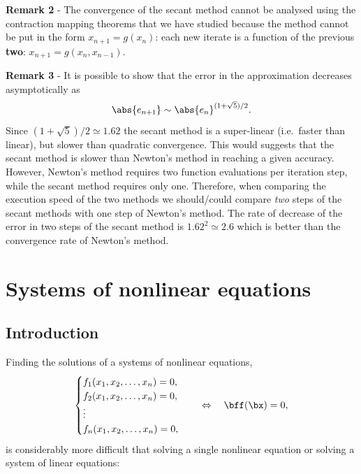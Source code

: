\noindent
\textbf{Remark 2} - The convergence of the secant method cannot be
analysed using the contraction mapping theorems that we have studied
because the method cannot be put in the form $x_{n+1} = g(x_n)$: each
new iterate is a function of the previous \textbf{two}: $x_{n+1} =
g(x_n, x_{n-1})$.

\noindent
\textbf{Remark 3} - It is possible to show that the
error in the approximation decreases asymptotically as
%
\begin{equation*}
  \abs{e_{n+1}} \sim \abs{e_n}^{(1+\sqrt{5})/2} .
\end{equation*}
%
Since $(1+\sqrt{5})/2 \simeq 1.62$ the secant method is a super-linear
(i.e.\ faster than linear), but slower than quadratic convergence.
This would suggests that the secant method is slower than Newton's
method in reaching a given accuracy.  However, Newton's method
requires two function evaluations per iteration step, while the secant
method requires only one.  Therefore, when comparing the execution
speed of the two methods we should/could compare \textit{two} steps of
the secant methods with one step of Newton's method.  The rate of
decrease of the error in two steps of the secant method is $1.62^2
\simeq 2.6$ which is better than the convergence rate of Newton's
method.

\section{Systems of nonlinear equations}

\subsection{Introduction}

Finding the solutions of a systems of nonlinear equations,
%
\begin{equation*}
  \begin{cases}
    f_1(x_1, x_2, \ldots, x_n) = 0 , \\
    f_2(x_1, x_2, \ldots, x_n) = 0 , \\
    \vdots \\
    f_n(x_1, x_2, \ldots, x_n) = 0 ,
  \end{cases}
 \quad \Leftrightarrow \quad
 \bff(\bx) = 0 ,
\end{equation*}
%
is considerably more difficult that solving a single nonlinear
equation or solving a system of linear equations:

